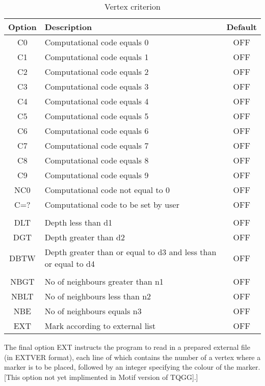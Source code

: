 \documentclass{article}
\begin{document}
\begin{table}[htb!]
 \caption{Vertex criterion}
\begin{center}
 \begin{tabular}{| c | l | c |}
	\hline
	Option & Description & Default\\
	\hline
	\hline	
	
	C0 & Computational code equals 0 & OFF\\ \hline
	C1 & Computational code equals 1 & OFF\\ \hline
	C2 & Computational code equals 2 & OFF\\ \hline
	C3 & Computational code equals 3 & OFF\\ \hline
	C4 & Computational code equals 4 & OFF\\ \hline
	C5 & Computational code equals 5 & OFF\\ \hline
	C6 & Computational code equals 6 & OFF\\ \hline
	C7 & Computational code equals 7 & OFF\\ \hline
	C8 & Computational code equals 8 & OFF\\ \hline
	C9 & Computational code equals 9 & OFF\\ \hline
	NC0 & Computational code not equal to 0 & OFF\\ \hline
	C=? & Computational code to be set by user & OFF\\ \hline
	 & & \\ \hline
	DLT & Depth less than d1 & OFF\\ \hline
	DGT & Depth greater than d2 & OFF\\ \hline
	DBTW & Depth greater than or equal to d3 and less than or equal to d4 & OFF\\ \hline
	 & & \\ \hline 
	NBGT & No of neighbours greater than n1 & OFF\\ \hline
	NBLT & No of neighbours less than n2 & OFF\\ \hline
	NBE & No of neighbours equals n3 & OFF\\ \hline
	EXT & Mark according to external list & OFF\\ \hline
 
 
 \end{tabular}
\end{center}
\end{table}




The final option EXT instructs the program to read in a prepared external file (in EXTVER format), each line of which contains the number of a vertex where a marker is to be placed, followed by an integer specifying the colour of the marker. [This option not yet implimented in Motif version of TQGG].]
\end{document}
